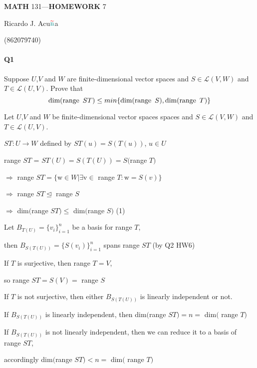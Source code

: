 \documentclass{article}
\begin{document}
\begin{center}
  \textbf{MATH} 131---\textbf{HOMEWORK} 7

  \color{red}R\color{teal}icardo
  \color{red}J\color{cyan}.
  \color{red}A\color{teal}cu$\color{red}{\widetilde{\color{teal}\text{n}}}$\color{teal}a\color{black}

  \color{teal}(\color{red}862079740\color{teal})\color{black}
\end{center}\vspace{1.618em}

\paragraph{Q1} Suppose $U$,$V$ and $W$ are finite-dimensional vector
spaces and $S \in \mathcal{L}(V,W)$ and $T \in
\mathcal{L}(U,V)$. Prove that
\[\text{dim(range}\enskip ST) \leq min\{\text{dim(range}\enskip
  S), \text{dim(range}\enskip T)\}\]
\vspace{0.618 em}

Let $U$,$V$ and $W$ be finite-dimensional vector spaces
spaces and $S \in \mathcal{L}(V,W)$ and $T \in
\mathcal{L}(U,V)$.

$ST: U \rightarrow W$ defined by $ST(u) = S(T(u))$, $u \in U$

range $ST$ = $ST(U) = S(T(U)) = S$$($range $T)$

$\Rightarrow$ range $ST = \{\mathrm{w} \in W | \exists \mathrm{v} \in$ range $T:
\mathrm{w} = S(v)\}$

$\Rightarrow$ range $ST \trianglelefteq$ range $S$

$\Rightarrow$ dim$($range $ST) \leq$ dim$($range $S)$ (1)

Let $B_{T(U)} = \{v_i\}_{i=1}^n$ be a basis for range $T$,

then
$B_{S(T(U))} = \{S(v_i)\}_{i=1}^n$ spans range $ST$ (by Q2 HW6)

If $T$ is surjective, then range $T = V$,

so range $ST = S(V) =$ range $S$

If $T$ is not surjective,
then either $B_{S(T(U))}$ is linearly
independent or not.

If $B_{S(T(U))}$ is linearly independent, then dim$($range $ST)
= n =$ dim$($ range $T)$

If $B_{S(T(U))}$ is not linearly independent, then we can reduce it
to a basis of range $ST$,

accordingly dim$($range $ST) < n =$ dim$($ range $T)$
\end{document}
